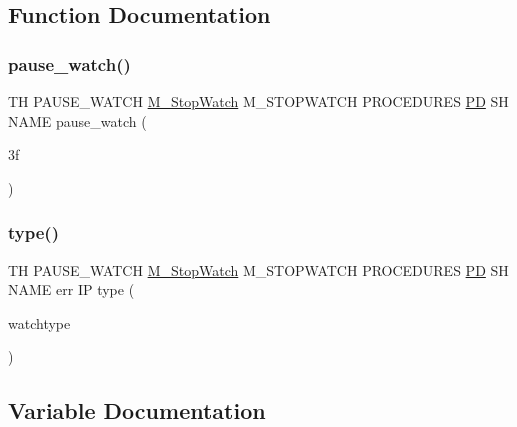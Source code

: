 \subsection{Function Documentation}
\mbox{\label{pause__watch_83_8txt_a1f08bdb77c0b77a9e57928cd240ce9ea}} 
\subsubsection{\texorpdfstring{pause\+\_\+watch()}{pause\_watch()}}
{\footnotesize\ttfamily TH P\+A\+U\+S\+E\+\_\+\+W\+A\+T\+CH \hyperlink{option__stopwatch_83_8txt_aa2011fc45a5e502e87ee50996a8a9305}{M\+\_\+\+Stop\+Watch} M\+\_\+\+S\+T\+O\+P\+W\+A\+T\+CH P\+R\+O\+C\+E\+D\+U\+R\+ES \hyperlink{what__overview_81_8txt_a85f26da5a4481fbdb0d9c79f2b94de3e}{PD} SH N\+A\+ME pause\+\_\+watch (\begin{DoxyParamCaption}\item[{3f}]{ }\end{DoxyParamCaption})}

\mbox{\label{pause__watch_83_8txt_a6d82b64df023fe3efbb7b896bcb179fa}} 
\subsubsection{\texorpdfstring{type()}{type()}}
{\footnotesize\ttfamily TH P\+A\+U\+S\+E\+\_\+\+W\+A\+T\+CH \hyperlink{option__stopwatch_83_8txt_aa2011fc45a5e502e87ee50996a8a9305}{M\+\_\+\+Stop\+Watch} M\+\_\+\+S\+T\+O\+P\+W\+A\+T\+CH P\+R\+O\+C\+E\+D\+U\+R\+ES \hyperlink{what__overview_81_8txt_a85f26da5a4481fbdb0d9c79f2b94de3e}{PD} SH N\+A\+ME err IP type (\begin{DoxyParamCaption}\item[{watchtype}]{ }\end{DoxyParamCaption})}



\subsection{Variable Documentation}
\mbox{\label{pause__watch_83_8txt_ae2a6300fc3b4629186796cf6d0c93440}} 
